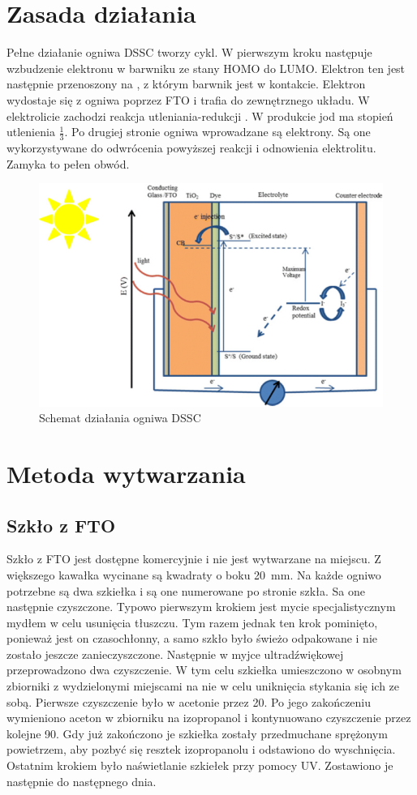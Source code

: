 \documentclass[a4, 12pt]{article}
\begin{document}
	\section{Zasada działania}
	Pełne działanie ogniwa DSSC tworzy cykl. W pierwszym kroku następuje wzbudzenie elektronu w barwniku ze stany HOMO do LUMO. Elektron ten jest następnie przenoszony na , z którym barwnik jest w kontakcie. Elektron wydostaje się z ogniwa poprzez FTO i trafia do zewnętrznego układu. W elektrolicie zachodzi reakcja utleniania-redukcji . W produkcie jod ma stopień utlenienia $\frac{1}{3}$. Po drugiej stronie ogniwa wprowadzane są elektrony. Są one wykorzystywane do odwrócenia powyższej reakcji i odnowienia elektrolitu. Zamyka to pełen obwód. 
	\begin{figure}[H]
		\centering
		\includegraphics[width=\textwidth]{dssc.png}
		\caption{Schemat działania ogniwa DSSC \cite{dssc;fundamentals}}
	\end{figure}
	
	\section{Metoda wytwarzania}
	\subsection{Szkło z FTO}
	Szkło z FTO jest dostępne komercyjnie i nie jest wytwarzane na miejscu. Z większego kawałka wycinane są kwadraty o boku \qty{20}{\mm}. Na każde ogniwo potrzebne są dwa szkiełka i są one numerowane po stronie szkła. Sa one następnie czyszczone. Typowo pierwszym krokiem jest mycie specjalistycznym mydłem w celu usunięcia tłuszczu. Tym razem jednak ten krok pominięto, ponieważ jest on czasochłonny, a samo szkło było świeżo odpakowane i nie zostało jeszcze zanieczyszczone. Następnie w myjce ultradźwiękowej przeprowadzono dwa czyszczenie. W tym celu szkiełka umieszczono w osobnym zbiorniki z wydzielonymi miejscami na nie w celu uniknięcia stykania się ich ze sobą. Pierwsze czyszczenie było w acetonie przez \qty{20}{\min}. Po jego zakończeniu wymieniono aceton w zbiorniku na izopropanol i kontynuowano czyszczenie przez kolejne \qty{90}{\min}. Gdy już zakończono je szkiełka zostały przedmuchane sprężonym powietrzem, aby pozbyć się resztek izopropanolu i odstawiono do wyschnięcia. Ostatnim krokiem było naświetlanie szkiełek przy pomocy UV. Zostawiono je następnie do następnego dnia. 
	
\end{document}
